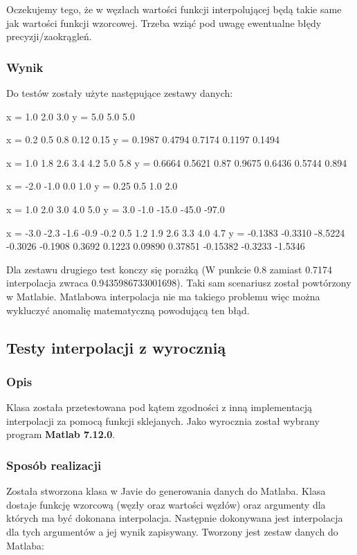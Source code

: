 \documentclass[a4paper,11pt,notitlepage]{article}
\begin{document}
Oczekujemy tego, że w węzłach wartości funkcji interpolującej będą takie same jak wartości funkcji wzorcowej. Trzeba wziąć pod uwagę ewentualne błędy precyzji/zaokrągleń.

\subsubsection{Wynik}

Do testów zostały użyte następujące zestawy danych:

x = 1.0 2.0 3.0
y = 5.0 5.0 5.0

x = 0.2 0.5 0.8 0.12 0.15 
y = 0.1987 0.4794 0.7174 0.1197 0.1494 

x = 1.0 1.8 2.6 3.4 4.2 5.0 5.8 
y = 0.6664 0.5621 0.87 0.9675 0.6436 0.5744 0.894 

x = -2.0 -1.0 0.0 1.0 
y = 0.25 0.5 1.0 2.0 

x = 1.0 2.0 3.0 4.0 5.0 
y = 3.0 -1.0 -15.0 -45.0 -97.0 

x = -3.0 -2.3 -1.6 -0.9 -0.2 0.5 1.2 1.9 2.6 3.3 4.0 4.7 
y = -0.1383 -0.3310 -8.5224 -0.3026 -0.1908 0.3692 0.1223 0.09890 0.37851 -0.15382 -0.3233 -1.5346

Dla zestawu drugiego test konczy się porażką (W punkcie 0.8 zamiast 0.7174 interpolacja zwraca 0.9435986733001698). Taki sam scenariusz został powtórzony w Matlabie. Matlabowa interpolacja nie ma takiego problemu więc można wykluczyć anomalię matematyczną powodującą ten błąd.

\subsection{Testy interpolacji z wyrocznią}

\subsubsection{Opis}

Klasa została przetestowana pod kątem zgodności z inną implementacją interpolacji za pomocą funkcji sklejanych. Jako wyrocznia został wybrany program \textbf{Matlab 7.12.0}.

\subsubsection{Sposób realizacji}

Została stworzona klasa w Javie do generowania danych do Matlaba. Klasa dostaje funkcję wzorcową (węzły oraz wartości węzłów) oraz argumenty dla których ma być dokonana interpolacja. Następnie dokonywana jest interpolacja dla tych argumentów a jej wynik zapisywany. Tworzony jest zestaw danych do Matlaba:
\end{document}
